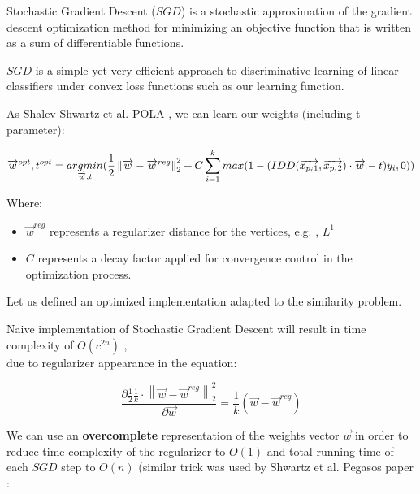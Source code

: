 Stochastic Gradient Descent ($SGD$) \cite{SGD} is a stochastic approximation of the gradient descent optimization method for minimizing an objective function that is written as a sum of differentiable functions.

$SGD$ is a simple yet very efficient approach to discriminative learning of linear classifiers under convex loss functions such as our learning function.

As Shalev-Shwartz et al. POLA \cite{shalev2004online}, we can learn our weights (including t parameter):

\begin{equation}
\overrightarrow{w}^{opt} , t^{opt} =\\ 
\underset{\overrightarrow{w} , t}{argmin} (\frac{1}{2}\left \| \overrightarrow{w} - \overrightarrow{w}^{reg} \right \|_2^2 + C \sum_{i=1}^{k}max(1-(IDD(\overrightarrow{x_{p_i1}} , \overrightarrow{x_{p_i2}}) \cdot \overrightarrow{w} - t)y_i , 0)) \end{equation}



Where:
\begin{itemize}
		\item $\overrightarrow{w}^{reg}$ represents a regularizer distance for the vertices, e.g. , $L^1$
	\item $C$ represents a decay factor applied for convergence control in the optimization process.
\end{itemize}

Let us defined an optimized implementation adapted to the similarity problem.

Naive implementation of Stochastic Gradient Descent will result in time complexity of $O(c^{2n})$  , \\
due to regularizer appearance in the equation: 


\begin{equation}
\frac{\partial\frac{1}{2}\frac{1}{k}\cdot
	\left \|\overrightarrow{w} - \overrightarrow{w}^{reg}  \right \|_{2}^{2}
}{\partial \overrightarrow{w}}  = \frac{1}{k}(\overrightarrow{w} -  \overrightarrow{w}^{reg})
\end{equation}

We can use an \textbf{overcomplete} representation of the weights vector $\overrightarrow{w}$ in order to reduce time complexity of the regularizer to $O(1)$ and total running time of each $SGD$ step to $O(n)$ (similar trick was used by Shwartz et al. Pegasos paper \cite{shalev2007pegasos}:

